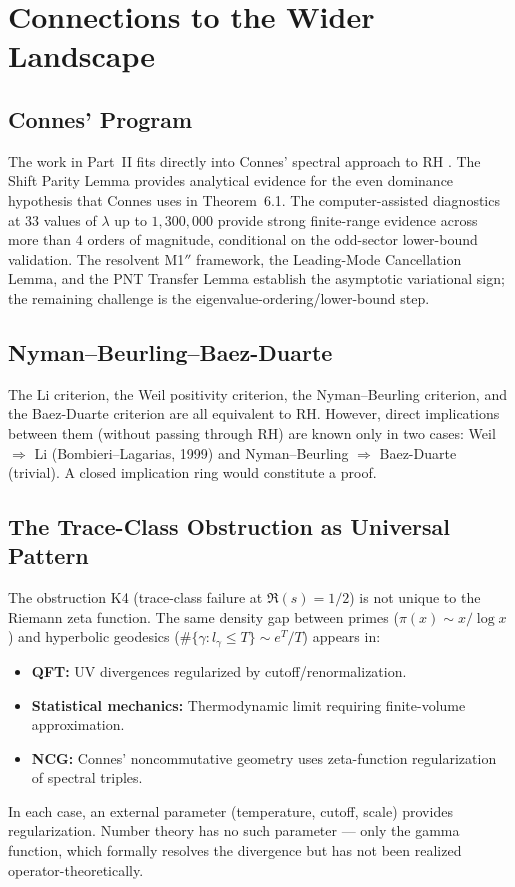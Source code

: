 \documentclass[12pt,a4paper]{article}
\theoremstyle{definition}
\theoremstyle{remark}
\begin{document}
\section{Connections to the Wider Landscape}
\label{sec:connections}

\subsection{Connes' Program}

The work in Part~II fits directly into Connes' spectral approach to RH \cite{Connes2026}. The Shift Parity Lemma provides analytical evidence for the even dominance hypothesis that Connes uses in Theorem~6.1. The computer-assisted diagnostics at $33$ values of $\lambda$ up to $1{,}300{,}000$ provide strong finite-range evidence across more than $4$ orders of magnitude, conditional on the odd-sector lower-bound validation. The resolvent M1$''$ framework, the Leading-Mode Cancellation Lemma, and the PNT Transfer Lemma establish the asymptotic variational sign; the remaining challenge is the eigenvalue-ordering/lower-bound step.

\subsection{Nyman--Beurling--Baez-Duarte}

The Li criterion, the Weil positivity criterion, the Nyman--Beurling criterion, and the Baez-Duarte criterion are all equivalent to RH. However, direct implications between them (without passing through RH) are known only in two cases: Weil $\Rightarrow$ Li (Bombieri--Lagarias, 1999) and Nyman--Beurling $\Rightarrow$ Baez-Duarte (trivial). A closed implication ring would constitute a proof.

\subsection{The Trace-Class Obstruction as Universal Pattern}

The obstruction K4 (trace-class failure at $\Re(s) = 1/2$) is not unique to the Riemann zeta function. The same density gap between primes ($\pi(x) \sim x/\log x$) and hyperbolic geodesics ($\#\{\gamma: l_\gamma \leq T\} \sim e^T/T$) appears in:
\begin{itemize}
  \item \textbf{QFT:} UV divergences regularized by cutoff/renormalization.
  \item \textbf{Statistical mechanics:} Thermodynamic limit requiring finite-volume approximation.
  \item \textbf{NCG:} Connes' noncommutative geometry uses zeta-function regularization of spectral triples.
\end{itemize}
In each case, an external parameter (temperature, cutoff, scale) provides regularization. Number theory has no such parameter --- only the gamma function, which formally resolves the divergence but has not been realized operator-theoretically.
\end{document}
